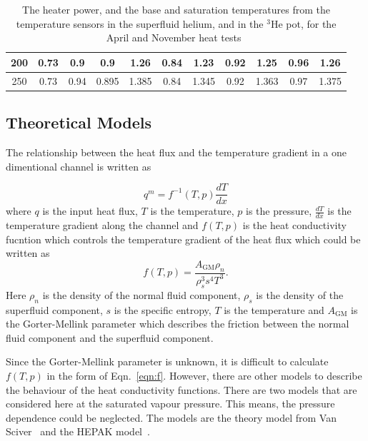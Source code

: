 \begin{table}
\begin{tabular}{|c|c|c|c|c|c|c|c|c|c|c|}
    \hline
    200 & 0.73 & 0.9 & 0.9 & 1.26 & 0.84 & 1.23 & 0.92 & 1.25 & 0.96 & 1.26 \\
    \hline
    250 & 0.73 & 0.94 & 0.895 & 1.385 & 0.84 & 1.345 & 0.92 & 1.363 & 0.97 & 1.375 \\
    \hline
  \end{tabular}
  \caption[Heater test data]{The heater power, and the base and
    saturation temperatures from the temperature sensors in the
    superfluid helium, and in the $^3$He pot, for the April and
    November heat tests~\cite{Florian_thesis}}
  \label{tab:heattest}
\end{table}


\subsection{Theoretical Models}
The relationship between the heat flux and the temperature gradient in
a one dimentional channel is written as

\begin{equation}
  \label{eqn:q_dT}
  q^m = f^{-1}\left(T, p \right) \frac{dT}{dx}
\end{equation}
where $q$ is the input heat flux, $T$ is the temperature, $p$ is the
pressure, $\frac{dT}{dx}$ is the temperature gradient along the
channel and $f\left(T, p \right)$ is the heat conductivity fucntion
which controls the temperature gradient of the heat flux which could
be written as
\begin{equation}
  \label{eqn:f}
f \left( T, p \right) = \frac{A_\mathrm{GM}\rho_n}{\rho_s^{3}s^4T^3}.
\end{equation}
Here $\rho_n$ is the density of the normal fluid component, $\rho_s$
is the density of the superfluid component, $s$ is the specific
entropy, $T$ is the temperature and $A_\mathrm{GM}$ is the
Gorter-Mellink parameter which describes the friction between the
normal fluid component and the superfluid component.

Since the Gorter-Mellink parameter is unknown, it is difficult to
calculate $f \left( T, p \right)$ in the form of
Eqn.~\ref{eqn:f}. However, there are other models to describe the
behaviour of the heat conductivity functions. There are two models
that are considered here at the saturated vapour pressure. This means,
the pressure dependence could be neglected. The models are the theory
model from Van Sciver~\cite{van2012helium} and the HEPAK
model~\cite{arp2005hepak}. %

